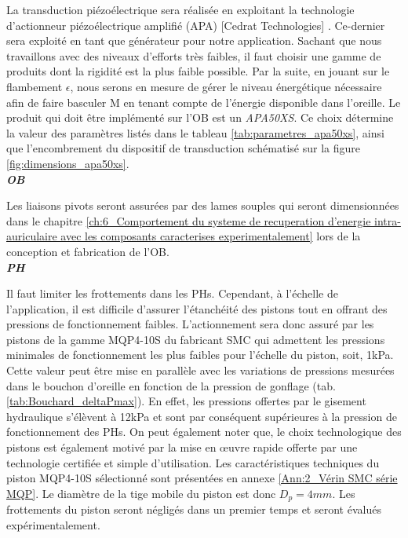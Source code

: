La transduction piézoélectrique sera réalisée en exploitant la technologie d'actionneur piézoélectrique amplifié (APA) [Cedrat Technologies] \cite{Huguet2018}. Ce-dernier sera exploité en tant que générateur pour notre application. Sachant que nous travaillons avec des niveaux d'efforts très faibles, il faut choisir une gamme de produits dont la rigidité est la plus faible possible. Par la suite, en jouant sur le flambement $\epsilon$, nous serons en mesure de gérer le niveau énergétique nécessaire afin de faire basculer M en tenant compte de l'énergie disponible dans l'oreille. Le produit qui doit être implémenté sur l'OB est un \emph{APA50XS}. Ce choix détermine la valeur des paramètres listés dans le tableau \ref{tab:parametres_apa50xs}, ainsi que l'encombrement du dispositif de transduction schématisé sur la figure \ref{fig:dimensions_apa50xs}.\\

\textbf{\textit{OB}}

Les liaisons pivots seront assurées par des lames souples qui seront dimensionnées dans le chapitre \ref{ch:6_Comportement du systeme de recuperation d’energie intra-auriculaire avec les composants caracterises experimentalement} lors de la conception et fabrication de l'OB.\\

\textbf{\textit{PH}}

Il faut limiter les frottements dans les PHs. Cependant, à l'échelle de l'application, il est difficile d'assurer l'étanchéité des pistons tout en offrant des pressions de fonctionnement faibles. L'actionnement sera donc assuré par les pistons de la gamme MQP4-10S du fabricant SMC qui admettent les pressions minimales de fonctionnement les plus faibles pour l'échelle du piston, soit, 1kPa. Cette valeur peut être mise en parallèle avec les variations de pressions mesurées dans le bouchon d'oreille en fonction de la pression de gonflage (tab. \ref{tab:Bouchard_deltaPmax}). En effet, les pressions offertes par le gisement hydraulique s'élèvent à 12kPa et sont par conséquent supérieures à la pression de fonctionnement des PHs. On peut également noter que, le choix technologique des pistons est également motivé par la mise en \oe{}uvre rapide offerte par une technologie certifiée et simple d'utilisation. Les caractéristiques techniques du piston MQP4-10S sélectionné sont présentées en annexe \ref{Ann:2_Vérin SMC série MQP}. Le diamètre de la tige mobile du piston est donc $D_p=4mm$. Les frottements du piston seront négligés dans un premier temps et seront évalués expérimentalement. \\

